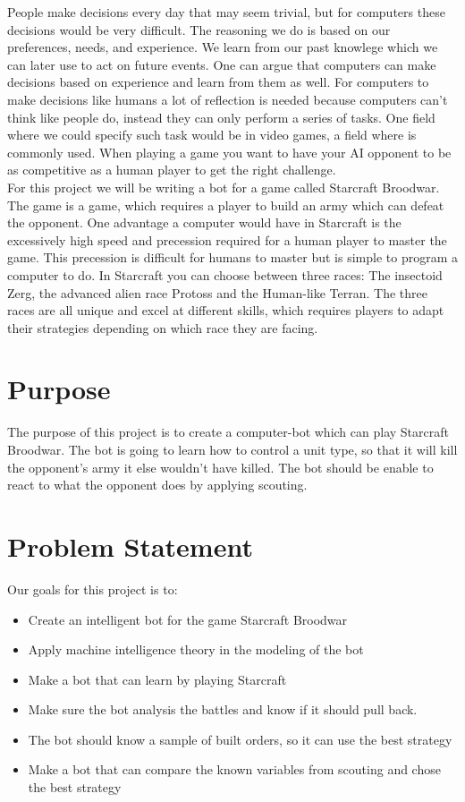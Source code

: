 People make decisions every day that may seem trivial, but for computers these decisions would be very difficult. The reasoning we do 
is based on our preferences, needs, and experience. We learn from our past knowlege which we can later use to act on future events. One can argue that computers can
make decisions based on experience and learn from them as well.
For computers to make decisions like humans a lot of reflection is needed because computers can't think like people do, instead they can only perform a series of tasks.
One field where we could specify such task would be in video games, a field where \abai is commonly used. When playing 
a game you want to have your AI opponent to be as competitive as a human player to get the right challenge. \\

For this project we will be writing a bot for a game called Starcraft Broodwar. The game is a \abrts game, which requires a player to build an army 
which can defeat the opponent. One advantage a computer would have in Starcraft is the excessively high speed and precession required for a human player to master the game. 
This precession is difficult for humans to master but is simple to program a computer to do.
In Starcraft you can choose between three races: The insectoid Zerg, the advanced alien race Protoss and the Human-like Terran. 
The three races are all unique and excel at different skills, which requires players to adapt their strategies depending on which race they are facing.


\section{Purpose}
	The purpose of this project is to create a computer-bot which can play Starcraft Broodwar. 
	The bot is going to learn how to control a unit type, so that it will kill the opponent's army it else wouldn't have killed.
	The bot should be enable to react to what the opponent does by applying scouting.

\section{Problem Statement}
	Our goals for this project is to:
	\begin{itemize}
		\item Create an intelligent bot for the game Starcraft Broodwar
		\item Apply machine intelligence theory in the modeling of the bot
		\item Make a bot that can learn by playing Starcraft
		\item Make sure the bot analysis the battles and know if it should pull back.
		\item The bot should know a sample of built orders, so it can use the best strategy
		\item Make a bot that can compare the known variables from scouting and chose the best strategy
	\end{itemize}

